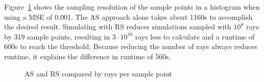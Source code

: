 Figure~\ref{plot:repetitive} shows the sampling resolution
of the sample points in a histogram when using a MSE of 0.001. 
The AS approach alone takes about 1160s to accomplish the desired result. Simulating with RS reduces
simulations sampled with $10^8$ rays by 319 sample points, resulting in 
$3\cdot10^{10}$ rays less to calculate and a runtime of 600s to reach the threshold. Because reducing the number of rays always
reduces runtime, it explains the difference in runtime
of 560s.
\begin{figure}[H]
  \centerline{
    }
  \caption{AS and RS compared by rays per sample point}
  \label{plot:repetitive}
\end{figure}

